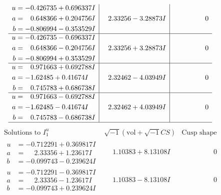 \documentclass[1p]{elsarticle_modified}
\theoremstyle{definition}
\newcommand{\I}{\sqrt{-1}}
\begin{document}
$$\begin{array}{c|c|c}
\begin{aligned}
u &= -0.426735 + 0.696337 I \\
a &= \phantom{-}0.648366 + 0.204756 I \\
b &= -0.806994 - 0.353529 I\end{aligned}
 & \phantom{-}2.33256 - 3.28873 I & \phantom{-0.000000 } 0 \\ \hline\begin{aligned}
u &= -0.426735 - 0.696337 I \\
a &= \phantom{-}0.648366 - 0.204756 I \\
b &= -0.806994 + 0.353529 I\end{aligned}
 & \phantom{-}2.33256 + 3.28873 I & \phantom{-0.000000 } 0 \\ \hline\begin{aligned}
u &= \phantom{-}0.971663 + 0.692788 I \\
a &= -1.62485 + 0.41674 I \\
b &= \phantom{-}0.745783 + 0.686738 I\end{aligned}
 & \phantom{-}2.32462 - 4.03949 I & \phantom{-0.000000 } 0 \\ \hline\begin{aligned}
u &= \phantom{-}0.971663 - 0.692788 I \\
a &= -1.62485 - 0.41674 I \\
b &= \phantom{-}0.745783 - 0.686738 I\end{aligned}
 & \phantom{-}2.32462 + 4.03949 I & \phantom{-0.000000 } 0\\
 \hline 
 \end{array}$$\newpage$$\begin{array}{c|c|c}  
\text{Solutions to }I^u_{1}& \I (\text{vol} + \sqrt{-1}CS) & \text{Cusp shape}\\
 \hline 
\begin{aligned}
u &= -0.712291 + 0.369817 I \\
a &= \phantom{-}2.33356 + 1.23617 I \\
b &= -0.099743 - 0.239624 I\end{aligned}
 & \phantom{-}1.10383 + 8.13108 I & \phantom{-0.000000 } 0 \\ \hline\begin{aligned}
u &= -0.712291 - 0.369817 I \\
a &= \phantom{-}2.33356 - 1.23617 I \\
b &= -0.099743 + 0.239624 I\end{aligned}
 & \phantom{-}1.10383 - 8.13108 I & \phantom{-0.000000 } 0 \\ \hline\begin{aligned}

\end{aligned}
\end{array}$$
\end{document}
